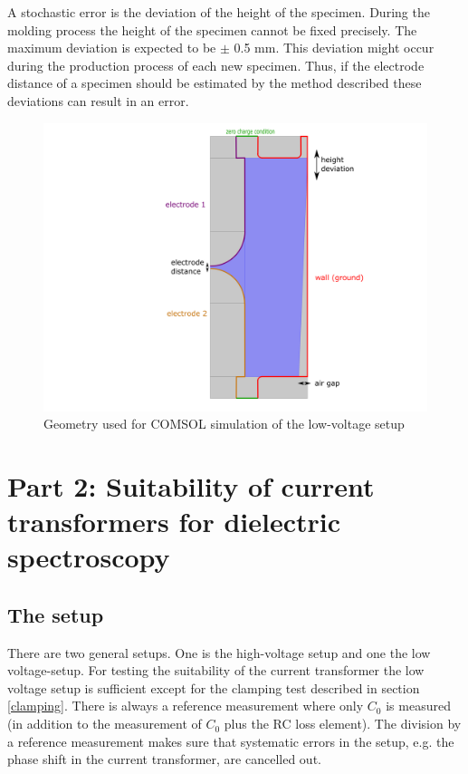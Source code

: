 A stochastic error is the deviation of the height of the specimen. During  the molding process the height of the specimen cannot be fixed precisely. The maximum deviation is expected to be $\pm$ 0.5 mm. This deviation might occur during the production process of each new specimen. Thus, if the electrode distance of a specimen should be estimated by the method described these deviations can result in an error. 
 \begin{figure}[htbp]
	\centering
	\includegraphics[width=\textwidth]{figures/Method/Part1_d_C0/cell_colour.png}		
	\caption[Kurze Abbildungsbeschreibung]{Geometry used for COMSOL simulation of the low-voltage setup} 
	\label{fig.syserrors}
\end{figure}

\section{Part 2:  Suitability of current transformers for dielectric spectroscopy}
\subsection{The setup}
There are two general setups. One is the high-voltage setup and one the low voltage-setup. For testing the suitability of the current transformer the low voltage setup is sufficient except for the clamping test described in section \ref{clamping}. There is always a reference measurement where only $C_0$ is measured (in addition to the measurement of $C_0$ plus the RC loss element). The division by a reference measurement makes sure that systematic errors in the setup, e.g. the phase shift in the current transformer, are cancelled out. 

